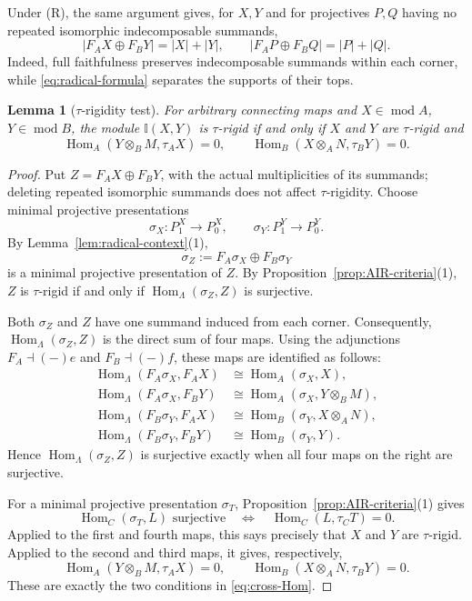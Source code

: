 \documentclass[11pt,reqno]{amsart}
\newtheorem{lemma}[theorem]{Lemma}
\theoremstyle{definition}
\theoremstyle{remark}
\newcommand{\modu}{\operatorname{mod}}
\newcommand{\Hom}{\operatorname{Hom}}
\numberwithin{equation}{section}
\begin{document}
Under \textup{(R)}, the same argument gives, for $X,Y$ and for projectives
$P,Q$ having no repeated isomorphic indecomposable summands,
\begin{equation}\label{eq:summand-counts}
 |F_AX\oplus F_BY|=|X|+|Y|,
 \qquad
 |F_AP\oplus F_BQ|=|P|+|Q|.
\end{equation}
Indeed, full faithfulness preserves indecomposable summands within each
corner, while \eqref{eq:radical-formula} separates the supports of their
tops.

\begin{lemma}[$\tau$-rigidity test]\label{lem:tau-rigid-direct}
For arbitrary connecting maps and $X\in\modu A$, $Y\in\modu B$, the
module $\mathbb I(X,Y)$ is $\tau$-rigid if and only if $X$ and $Y$ are
$\tau$-rigid and
\begin{equation}\label{eq:cross-Hom}
 \Hom_A(Y\otimes_BM,\tau_AX)=0,
 \qquad
 \Hom_B(X\otimes_AN,\tau_BY)=0.
\end{equation}
\end{lemma}

\begin{proof}
Put $Z=F_AX\oplus F_BY$, with the actual multiplicities of its summands;
deleting repeated isomorphic summands does not affect $\tau$-rigidity.
Choose minimal projective presentations
\[
 \sigma_X:P_1^X\longrightarrow P_0^X,
 \qquad
 \sigma_Y:P_1^Y\longrightarrow P_0^Y.
\]
By Lemma~\ref{lem:radical-context}\textup{(1)},
\[
 \sigma_Z:=F_A\sigma_X\oplus F_B\sigma_Y
\]
is a minimal projective presentation of $Z$.  By
Proposition~\ref{prop:AIR-criteria}\textup{(1)}, $Z$ is $\tau$-rigid
if and only if $\Hom_\Lambda(\sigma_Z,Z)$ is surjective.

Both $\sigma_Z$ and $Z$ have one summand induced from each corner.
Consequently, $\Hom_\Lambda(\sigma_Z,Z)$ is the direct sum of four maps.
Using the adjunctions $F_A\dashv(-)e$ and $F_B\dashv(-)f$, these maps are
identified as follows:
\[
\begin{aligned}
 \Hom_\Lambda(F_A\sigma_X,F_AX)
   &\cong \Hom_A(\sigma_X,X),\\
 \Hom_\Lambda(F_A\sigma_X,F_BY)
   &\cong \Hom_A(\sigma_X,Y\otimes_BM),\\
 \Hom_\Lambda(F_B\sigma_Y,F_AX)
   &\cong \Hom_B(\sigma_Y,X\otimes_AN),\\
 \Hom_\Lambda(F_B\sigma_Y,F_BY)
   &\cong \Hom_B(\sigma_Y,Y).
\end{aligned}
\]
Hence $\Hom_\Lambda(\sigma_Z,Z)$ is surjective exactly when all four maps
on the right are surjective.

For a minimal projective presentation $\sigma_T$,
Proposition~\ref{prop:AIR-criteria}\textup{(1)} gives
\[
 \Hom_C(\sigma_T,L)\text{ surjective}
 \quad\Longleftrightarrow\quad
 \Hom_C(L,\tau_CT)=0.
\]
Applied to the first and fourth maps, this says precisely that $X$ and
$Y$ are $\tau$-rigid.  Applied to the second and third maps, it gives,
respectively,
\[
 \Hom_A(Y\otimes_BM,\tau_AX)=0,
 \qquad
 \Hom_B(X\otimes_AN,\tau_BY)=0.
\]
These are exactly the two conditions in \eqref{eq:cross-Hom}.
\end{proof}
\end{document}
